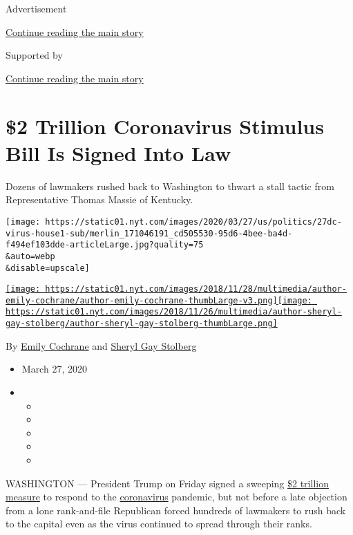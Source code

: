 Advertisement

\protect\hyperlink{after-top}{Continue reading the main story}

Supported by

\protect\hyperlink{after-sponsor}{Continue reading the main story}

\hypertarget{2-trillion-coronavirus-stimulus-bill-is-signed-into-law}{%
\section{\$2 Trillion Coronavirus Stimulus Bill Is Signed Into
Law}\label{2-trillion-coronavirus-stimulus-bill-is-signed-into-law}}

Dozens of lawmakers rushed back to Washington to thwart a stall tactic
from Representative Thomas Massie of Kentucky.

\texttt{[image: https://static01.nyt.com/images/2020/03/27/us/politics/27dc-virus-house1-sub/merlin\_171046191\_cd505530-95d6-4bee-ba4d-f494ef103dde-articleLarge.jpg?quality=75\\\&auto=webp\\\&disable=upscale]}

\href{https://www.nytimes.com/by/emily-cochrane}{\texttt{[image: https://static01.nyt.com/images/2018/11/28/multimedia/author-emily-cochrane/author-emily-cochrane-thumbLarge-v3.png]}}\href{https://www.nytimes.com/by/sheryl-gay-stolberg}{\texttt{[image: https://static01.nyt.com/images/2018/11/26/multimedia/author-sheryl-gay-stolberg/author-sheryl-gay-stolberg-thumbLarge.png]}}

By \href{https://www.nytimes.com/by/emily-cochrane}{Emily Cochrane} and
\href{https://www.nytimes.com/by/sheryl-gay-stolberg}{Sheryl Gay
Stolberg}

\begin{itemize}
\item
  March 27, 2020
\item
  \begin{itemize}
  \item
  \item
  \item
  \item
  \item
  \end{itemize}
\end{itemize}

WASHINGTON --- President Trump on Friday signed a sweeping
\href{https://www.nytimes.com/article/coronavirus-stimulus-package-questions-answers.html}{\$2
trillion measure} to respond to the
\href{https://www.nytimes.com/2020/03/27/world/coronavirus-news.html}{coronavirus}
pandemic, but not before a late objection from a lone rank-and-file
Republican forced hundreds of lawmakers to rush back to the capital even
as the virus continued to spread through their ranks.

